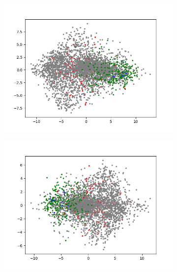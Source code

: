 \begin{figure}[H]
\begin{subfigure}{.25\textwidth}
        \includegraphics[width=\textwidth]{images/figures/experiments_latent/pooling_dim1024_PCA_classes.png}
    \end{subfigure}%
    \begin{subfigure}{.25\textwidth}
        \centering
        \includegraphics[width=\textwidth]{images/figures/experiments_latent/pooling_dim50_PCA_classes.png}
    \end{subfigure}
    \begin{subfigure}{.25\textwidth}
        \centering

\end{subfigure}
\end{figure}
